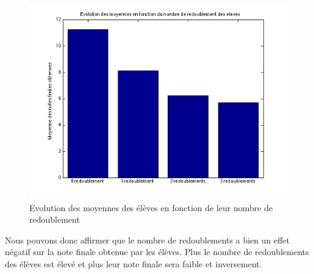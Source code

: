 \documentclass[11pt]{article}
\begin{document}
\begin{figure}[h]
\centering
\includegraphics[scale=0.6]{Images/fig29.png}
\caption{Evolution des moyennes des élèves en fonction de leur nombre de redoublement}
\end{figure}
Nous pouvons donc affirmer que le nombre de redoublements a bien un effet négatif sur la note finale obtenue par les élèves. Plus le nombre de redoublements des élèves est élevé et plus leur note finale sera faible et inversement.
\end{document}

